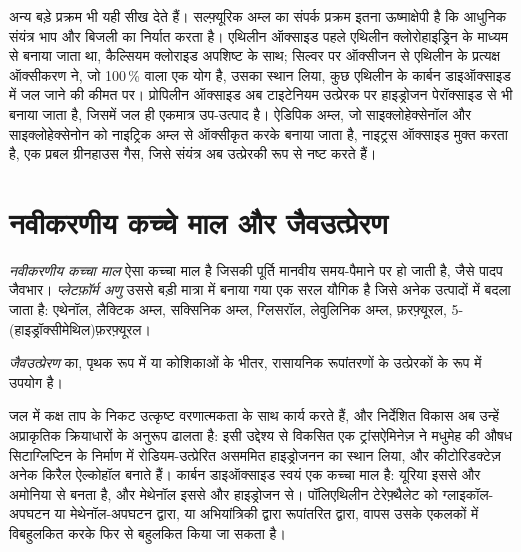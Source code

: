 अन्य बड़े प्रक्रम भी यही सीख देते हैं। सल्फ़्यूरिक
अम्ल का संपर्क प्रक्रम इतना ऊष्माक्षेपी है कि आधुनिक संयंत्र भाप और बिजली का निर्यात करता है।
एथिलीन ऑक्साइड पहले एथिलीन क्लोरोहाइड्रिन के माध्यम से बनाया जाता था, कैल्सियम
क्लोराइड अपशिष्ट के साथ; सिल्वर पर ऑक्सीजन से एथिलीन के प्रत्यक्ष ऑक्सीकरण ने, जो
100\,\%  वाला एक योग है, उसका स्थान लिया, कुछ एथिलीन के
कार्बन डाइऑक्साइड में जल जाने की कीमत पर। प्रोपिलीन ऑक्साइड अब टाइटेनियम 
उत्प्रेरक पर हाइड्रोजन पेरॉक्साइड से भी बनाया जाता है, जिसमें जल ही एकमात्र उप-उत्पाद है। ऐडिपिक अम्ल,
जो साइक्लोहेक्सेनॉल और साइक्लोहेक्सेनोन को नाइट्रिक अम्ल से ऑक्सीकृत करके बनाया जाता है, नाइट्रस
ऑक्साइड मुक्त करता है, एक प्रबल ग्रीनहाउस गैस, जिसे संयंत्र अब उत्प्रेरकी रूप से नष्ट करते हैं।

\section{नवीकरणीय कच्चे माल और जैवउत्प्रेरण}

\begin{definition}[नवीकरणीय कच्चे माल]\label{def:b3:green-industrial:feedstock}
\emph{नवीकरणीय कच्चा माल} ऐसा कच्चा माल है जिसकी
पूर्ति मानवीय समय-पैमाने पर हो जाती है, जैसे पादप जैवभार। \emph{प्लेटफ़ॉर्म
अणु} उससे बड़ी मात्रा में बनाया गया एक सरल यौगिक है जिसे
अनेक उत्पादों में बदला जाता है: एथेनॉल, लैक्टिक अम्ल, सक्सिनिक अम्ल,
ग्लिसरॉल, लेवुलिनिक अम्ल, फ़रफ़्यूरल, 5-(हाइड्रॉक्सीमेथिल)फ़रफ़्यूरल।
\end{definition}

\begin{definition}[जैवउत्प्रेरण]\label{def:b3:green-industrial:biocatalysis}
\emph{जैवउत्प्रेरण}  का, पृथक रूप में या
कोशिकाओं के भीतर, रासायनिक रूपांतरणों के उत्प्रेरकों के रूप में उपयोग है।
\end{definition}

 जल में कक्ष ताप के निकट उत्कृष्ट वरणात्मकता के साथ कार्य करते हैं, और
निर्देशित विकास अब उन्हें अप्राकृतिक क्रियाधारों के अनुरूप ढालता है: इसी उद्देश्य से
विकसित एक ट्रांसऐमिनेज़ ने मधुमेह की औषध सिटाग्लिप्टिन के निर्माण में
रोडियम-उत्प्रेरित असममित हाइड्रोजनन का स्थान लिया, और कीटोरिडक्टेज़ अनेक
किरैल ऐल्कोहॉल बनाते हैं। कार्बन डाइऑक्साइड स्वयं एक कच्चा माल है: यूरिया इससे और
अमोनिया से बनता है, और मेथेनॉल इससे और हाइड्रोजन से। पॉलिएथिलीन टेरेफ़्थैलेट को
ग्लाइकॉल-अपघटन या मेथेनॉल-अपघटन द्वारा, या अभियांत्रिकी द्वारा रूपांतरित
 द्वारा, वापस उसके एकलकों में विबहुलकित करके फिर से बहुलकित किया जा सकता है।

